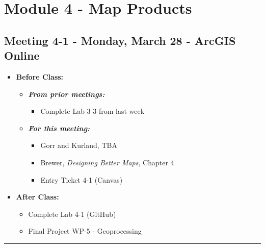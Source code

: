 \documentclass[
]{book}
\providecommand{\tightlist}{%
  \setlength{\itemsep}{0pt}\setlength{\parskip}{0pt}}
\begin{document}
\hypertarget{module-4---map-products}{%
\section*{Module 4 - Map Products}\label{module-4---map-products}}

\hypertarget{meeting-4-1---monday-march-28---arcgis-online}{%
\subsection*{Meeting 4-1 - Monday, March 28 - ArcGIS Online}\label{meeting-4-1---monday-march-28---arcgis-online}}

\begin{itemize}
\tightlist
\item
  \textbf{Before Class:}

  \begin{itemize}
  \tightlist
  \item
    \textbf{\emph{From prior meetings:}}

    \begin{itemize}
    \tightlist
    \item
      Complete Lab 3-3 from last week
    \end{itemize}
  \item
    \textbf{\emph{For this meeting:}}

    \begin{itemize}
    \tightlist
    \item
      Gorr and Kurland, TBA
    \item
      Brewer, \emph{Designing Better Maps}, Chapter 4
    \item
      Entry Ticket 4-1 (Canvas)
    \end{itemize}
  \end{itemize}
\item
  \textbf{After Class:}

  \begin{itemize}
  \tightlist
  \item
    Complete Lab 4-1 (GitHub)
  \item
    Final Project WP-5 - Geoprocessing
  \end{itemize}
\end{itemize}

\begin{center}\rule{0.5\linewidth}{0.5pt}\end{center}
\end{document}
